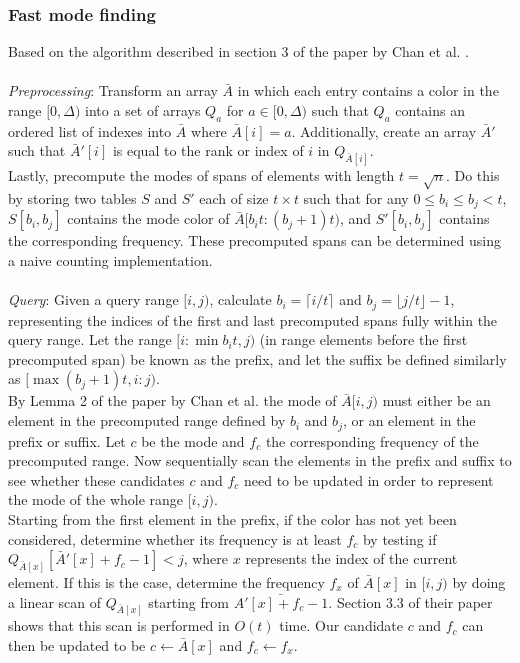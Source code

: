 \documentclass{article}
\newcommand{\fb}[1]{{\color{blue}#1}}
\begin{document}
\subsubsection{Fast mode finding}
Based on the algorithm described in section 3 of the paper by Chan et al.
\cite{Chan2014}. \\\\ \textit{Preprocessing}: Transform an array $\bar{A}$ in
which each entry contains a color in the range $[0, \Delta)$ into a set of
arrays $Q_a$ for $a \in [0, \Delta)$ such that $Q_a$ contains an ordered list
of indexes into $\bar{A}$ where $\bar{A}[i] = a$. Additionally, create an array
$\bar{A}'$ such that $\bar{A}'[i]$ is equal to the rank or index of $i$ in
$Q_{\bar{A}[i]}$. \\ Lastly, precompute the modes of spans of elements with
length $t = \sqrt{n}$. Do this by storing two tables $S$ and $S'$ each of size
$t \times t$ such that for any $0\leq b_i \leq b_j < t$, $S[b_i, b_j]$ contains
the mode color of $\bar{A}[b_it : (b_j + 1)t)$, and $S'[b_i, b_j]$ contains the
corresponding frequency. These precomputed spans can be determined using a
naive counting implementation. \\\\ \textit{Query}: Given a query range $[i,
    j)$, calculate $b_i=\lceil i/t \rceil$ and $b_j=\lfloor j/t \rfloor - 1$,
representing the indices of the first and last precomputed spans fully within
the query range. Let the range $[i : \min{b_it, j})$ (in range elements before
the first precomputed span) be known as the prefix, and let the suffix be
defined similarly as $[\max{(b_j + 1)t, i} : j)$. \\ \fb{By Lemma 2 of the paper by Chan et al.} the mode of $\bar{A}[i,
    j)$ must either be an element in the precomputed range defined by $b_i$ and
$b_j$, or an element in the prefix or suffix. Let $c$ be the mode and $f_c$ the
corresponding frequency of the precomputed range. Now sequentially scan the
elements \fb{in} the prefix and suffix to see whether these candidates $c$ and $f_c$
need to be updated in order to represent the mode of the whole range $[i, j)$.
\\ Starting from the first element in the prefix, if the color has not yet been
considered, determine whether its frequency is at least $f_c$ by testing if
$Q_{\bar{A}[x]}[\bar{A}'[x] + f_c - 1] < j$, where $x$ represents the index of
the current element. If this is the case, determine the frequency $f_x$ of
$\bar{A}[x]$ in $[i, j)$ by doing a linear scan of $Q_{\bar{A}[x]}$ \fb{starting from $\bar{A'[x] + f_c - 1}$. Section 3.3 of their paper shows that this scan is performed in $O(t)$ time}. Our
candidate $c$ and $f_c$ can then be updated to be $c \leftarrow \bar{A}[x]$ and
$f_c \leftarrow f_x$.
\end{document}
